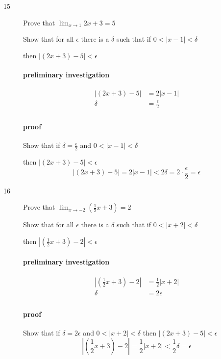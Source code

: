 \documentclass[letterpaper, landscape]{exam}
\begin{document}
\begin{description}
      \pagebreak

      \item[15] Prove that $\lim_{x \to 1} 2x + 3 = 5$

        Show that for all $\epsilon$ there is a $\delta$ such that if 
        $0 < |x - 1| < \delta$ 
        
        then $|(2x + 3) - 5| < \epsilon$

        \paragraph{preliminary investigation}
        \begin{align*}
          |(2x + 3) - 5| & = 2|x - 1| \\
          \delta         & = \frac{\epsilon}{2} \\
        \end{align*}

        \paragraph{proof}
        Show that if $\delta = \frac{\epsilon}{2}$ and $0 < |x - 1| < \delta$

        then $|(2x + 3) - 5| < \epsilon$
        \[
          |(2x + 3) - 5| = 2|x - 1| < 2 \delta = 2 \cdot \frac{\epsilon}{2} = \epsilon
        \]

      \newpage

      \item[16] Prove that $\lim_{x \to -2} \left( \frac{1}{2} x + 3 \right) = 2$

        Show that for all $\epsilon$ there is a $\delta$ such that if 
        $0 < |x + 2| < \delta$ 
        
        then $ \left| \left( \frac{1}{2} x + 3 \right) - 2 \right| < \epsilon$

        \paragraph{preliminary investigation}
        \begin{align*}
          \left| \left( \frac{1}{2} x + 3 \right) - 2 \right| & = \frac{1}{2}|x + 2| \\
          \delta         & = 2 \epsilon \\
        \end{align*}

        \paragraph{proof}
        Show that if $\delta = 2 \epsilon$ and $0 < |x + 2| < \delta$
        then $|(2x + 3) - 5| < \epsilon$
        \[
          \left| \left( \frac{1}{2} x + 3 \right) - 2 \right| = \frac{1}{2} |x + 2| < \frac{1}{2} \delta = \epsilon
        \]


\end{description}
\end{document}
